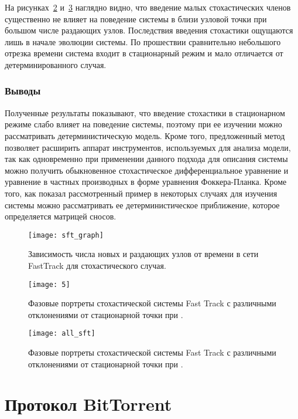 \documentclass[floatfix,
showkeys,
twocolumn, nofootinbib, superscriptaddress, ]{revtex4-1}
\begin{document}
  На рисунках~\ref{fig:ft5} и~\ref{fig:all_sft} наглядно видно, что
  введение малых стохастических членов существенно не влияет на
  поведение системы в близи узловой точки при большом числе раздающих
  узлов. Последствия введения стохастики ощущаются лишь в начале
  эволюции системы. По прошествии сравнительно небольшого отрезка
  времени система входит в стационарный режим и мало отличается от
  детерминированного случая.

\subsubsection{Выводы}

  Полученные результаты показывают, что введение стохастики в
  стационарном режиме слабо влияет на поведение системы, поэтому при
  ее изучении можно рассматривать детерминистическую модель. Кроме
  того, предложенный метод позволяет расширить аппарат инструментов,
  используемых для анализа модели, так как одновременно при применении
  данного подхода для описания системы можно получить обыкновенное
  стохастическое дифференциальное уравнение и уравнение в частных
  производных в форме уравнения Фоккера-Планка. Кроме того, как
  показал рассмотренный пример в некоторых случаях для изучения
  системы можно рассматривать ее детерминистическое приближение,
  которое определяется матрицей сносов.


\begin{figure}\centering
  \texttt{[image: sft\_graph]}
  \caption{Зависимость числа новых и раздающих узлов от времени в
    сети FastTrack для стохастического случая.}
\label{fig:sft_graph}
\end{figure}


\begin{figure}\centering
  \texttt{[image: 5]}
  \caption{Фазовые портреты стохастической системы Fast Track с
    различными отклонениями  от стационарной
    точки при .}
\label{fig:ft5}
\end{figure}



\begin{figure}\centering
  \texttt{[image: all\_sft]}
  \caption{Фазовые портреты стохастической системы Fast Track с
    различными отклонениями  от стационарной
    точки при .}
\label{fig:all_sft}
\end{figure}

\section{Протокол BitTorrent}
\end{document}
